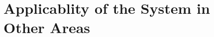 \chapter{Applicablity of the System in Other Areas}
\ifpdf
    \graphicspath{{Chapter4/Chapter4Figs/PNG/}{Chapter4/Chapter4Figs/PDF/}{Chapter4/Chapter4Figs/}}
\else
    \graphicspath{{Chapter4/Chapter4Figs/EPS/}{Chapter4/Chapter4Figs/}}
\fi





